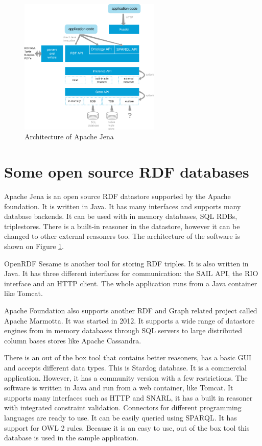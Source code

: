 \begin{figure}[h]
\centering
\includegraphics[width=0.6\textwidth]{figures/jena-architecture.png}
\caption{Architecture of Apache Jena\label{fig:jena}}
\end{figure}


\section{Some open source RDF databases} 

Apache Jena is an open source RDF datastore supported by the Apache foundation. It is written in Java\cite{jena}. It has many interfaces and supports many database backends. It can be used with in memory databases, SQL RDBs, triplestores. There is a built-in reasoner in the datastore, however it can be changed to other external reasoners too. The architecture of the software is shown on Figure \ref{fig:jena}.

OpenRDF Sesame is another tool for storing RDF triples. It is also written in Java. It has three different interfaces for communication: the SAIL API, the RIO interface and an HTTP client. The whole application runs from a Java container like Tomcat.

Apache Foundation also supports another RDF and Graph related project called Apache Marmotta. It was started in 2012. It supports a wide range of datastore engines from in memory databases through SQL servers to large distributed column bases stores like Apache Cassandra. 

There is an out of the box tool that contains better reasoners, has a basic GUI and accepts different data types. This is Stardog database. It is a commercial application. However, it has a community version with a few restrictions. The software is written in Java and run from a web container, like Tomcat. It supports many interfaces such as HTTP and SNARL, it has a built in reasoner with integrated constraint validation. Connectors for different programming languages are ready to use. It can be easily queried using SPARQL. It has support for OWL 2 rules. Because it is an easy to use, out of the box tool this database  is used in the sample application.

